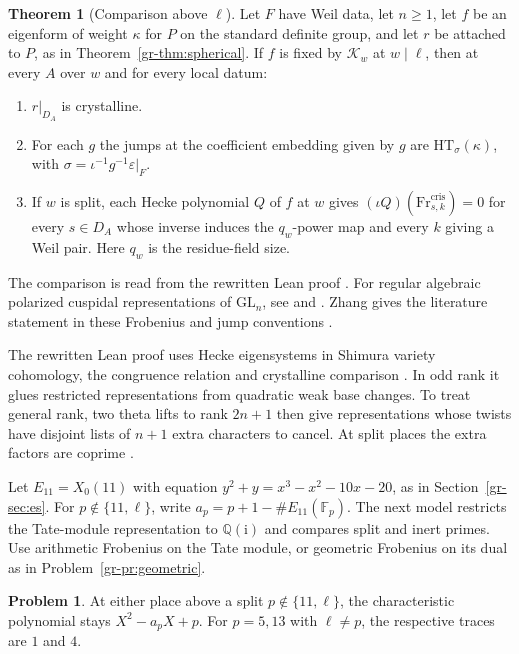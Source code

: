 \documentclass[reqno]{amsart}
\theoremstyle{definition}
\newtheorem{problem}{Problem}[section]
\newtheorem{theorem}{Theorem}[section]
\newcommand{\Q}{\mathbb Q}
\newcommand{\F}{\mathbb F}
\newcommand{\GL}{\mathrm{GL}}
\newcommand{\Fr}{\mathrm{Fr}}
\newcommand{\HT}{\mathrm{HT}}
\newcommand{\ii}{\mathrm i}
\begin{document}
\begin{theorem}[Comparison above \(\ell\)]\label{thm:at-ell}
Let \(F\) have Weil data, let \(n\ge1\), let \(f\) be an eigenform of weight \(\kappa\) for \(P\) on the standard definite group, and let \(r\) be attached to \(P\), as in Theorem~\ref{gr-thm:spherical}.  If \(f\) is fixed by \(\mathcal K_w\) at \(w\mid\ell\), then at every \(A\) over \(w\) and for every local datum:
\begin{enumerate}
\item[(a)] \(r|_{D_A}\) is crystalline.
\item[(b)] For each \(g\) the jumps at the coefficient embedding given by \(g\) are \(\HT_\sigma(\kappa)\), with \(\sigma=\iota^{-1}g^{-1}\varepsilon|_F\).
\item[(c)] If \(w\) is split, each Hecke polynomial \(Q\) of \(f\) at \(w\) gives \((\iota Q)(\Fr^{\mathrm{cris}}_{s,k})=0\) for every \(s\in D_A\) whose inverse induces the \(q_w\)-power map and every \(k\) giving a Weil pair.  Here \(q_w\) is the residue-field size.
\end{enumerate}
\end{theorem}
The comparison is read from the rewritten Lean proof \cite{GL}.  For regular algebraic polarized cuspidal representations of \(\GL_n\), see \cite[Theorem~2.1.1]{BLGGT} and \cite{BLGGT2}.  Zhang gives the literature statement in these Frobenius and jump conventions \cite[Theorem~4.1]{Zh}.

The rewritten Lean proof uses Hecke eigensystems in Shimura variety cohomology, the congruence relation and crystalline comparison \cite{GL}.  In odd rank it glues restricted representations from quadratic weak base changes.  To treat general rank, two theta lifts to rank \(2n+1\) then give representations whose twists have disjoint lists of \(n+1\) extra characters to cancel.  At split places the extra factors are coprime \cite{GL}.

Let \(E_{11}=X_0(11)\) with equation \(y^2+y=x^3-x^2-10x-20\), as in Section~\ref{gr-sec:es}.  For \(p\notin\{11,\ell\}\), write \(a_p=p+1-\#E_{11}(\F_p)\).  The next model restricts the Tate-module representation to \(\Q(\ii)\) and compares split and inert primes.  Use arithmetic Frobenius on the Tate module, or geometric Frobenius on its dual as in Problem~\ref{gr-pr:geometric}.

\begin{problem}\label{pr:split-base}
At either place above a split \(p\notin\{11,\ell\}\), the characteristic polynomial stays \(X^2-a_pX+p\).  For \(p=5,13\) with \(\ell\ne p\), the respective traces are \(1\) and \(4\).
\end{problem}
\end{document}
